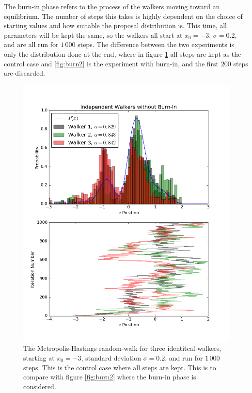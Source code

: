\documentclass[twocolumn]{article}
\begin{document}
The burn-in phase refers to the process of the walkers moving toward an
equilibrium. The number of steps this takes is highly dependent on the choice of
starting values and how suitable the proposal distribution is. This time, all
parameters will be kept the same, so the walkers all start at $x_0 = -3$,
$\sigma = 0.2$, and are all run for $1\,000$ steps. The difference between the
two experiments is only the distribution done at the end, where in figure
\ref{fig:burn1} all steps are kept as the control case and \ref{fig:burn2} is
the experiment with burn-in, and the first $200$ steps are discarded.

\begin{figure}[p]
	\centering
	\includegraphics[width=\linewidth]{burn1.png}
	\caption{
		The Metropolis-Hastings random-walk for three identitcal walkers, starting
		at $x_0 = -3$, standard deviation $\sigma = 0.2$, and run for $1\,000$
		steps. This is the control case where all steps are kept. This is to compare
		with figure \ref{fig:burn2} where the burn-in phase is considered.
	}
	\label{fig:burn1}
\end{figure}
\end{document}
